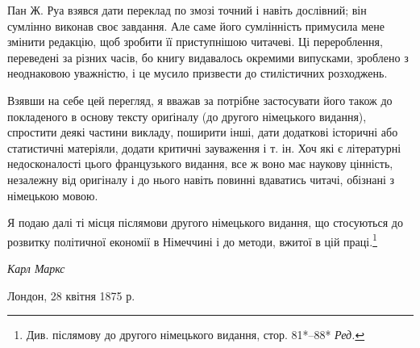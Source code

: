 Пан Ж. Руа взявся дати переклад по змозі точний і навіть
дослівний; він сумлінно виконав своє завдання. Але саме його
сумлінність примусила мене змінити редакцію, щоб зробити її
приступнішою читачеві. Ці перероблення, переведені за різних
часів, бо книгу видавалось окремими випусками, зроблено з
неоднаковою уважністю, і це мусило призвести до стилістичних
розходжень.

Взявши на себе цей перегляд, я вважав за потрібне застосувати
його також до покладеного в основу тексту ориґіналу (до другого
німецького видання), спростити деякі частини викладу, поширити
інші, дати додаткові історичні або статистичні матеріяли, додати
критичні зауваження і т. ін. Хоч які є літературні недосконалості
цього французького видання, все ж воно має наукову цінність,
незалежну від оригіналу і до нього навіть повинні вдаватись
читачі, обізнані з німецькою мовою.

Я подаю далі ті місця післямови другого німецького видання,
що стосуються до розвитку політичної економії в Німеччині і до
методи, вжитої в цій праці.\footnote*{
Див. післямову до другого німецького видання, стор. 81*--88* \emph{Ред.}
}

\begin{flushright}
\emph{Карл Маркс}
\end{flushright}

Лондон, 28 квітня 1875 р.
